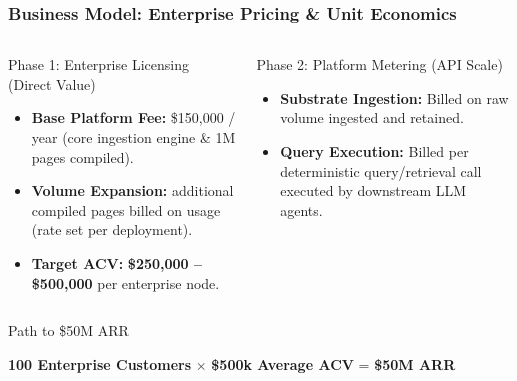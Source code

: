 \documentclass[aspectratio=169,11pt]{beamer}
\begin{document}
	\begin{frame}
		\frametitle{Business Model: Enterprise Pricing \& Unit Economics}

		\begin{columns}[T]
			\begin{block}{Phase 1: Enterprise Licensing (Direct Value)}
				\begin{itemize}
					\item \textbf{Base Platform Fee:} \$150,000 / year (core ingestion engine \& 1M pages compiled).
					\item \textbf{Volume Expansion:} additional compiled pages billed on usage (rate set per deployment).
					\item \textbf{Target ACV:} \textbf{\$250,000 – \$500,000} per enterprise node.
				\end{itemize}
			\end{block}

			\begin{block}{Phase 2: Platform Metering (API Scale)}
				\begin{itemize}
					\item \textbf{Substrate Ingestion:} Billed on raw volume ingested and retained.
					\item \textbf{Query Execution:} Billed per deterministic query/retrieval call executed by downstream LLM agents.
				\end{itemize}
			\end{block}
		\end{columns}
		\vspace{0.2cm}
		\centering
		\begin{block}{\scriptsize Path to \$50M ARR}
			{\centering\small \textbf{100 Enterprise Customers} $\times$ \textbf{\$500k Average ACV} = \textbf{\$50M ARR} \par}
		\end{block}
	\end{frame}
\end{document}
